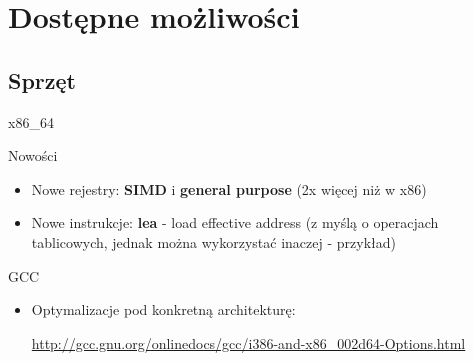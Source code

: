 \section{Dostępne możliwości} %
\subsection{Sprzęt}
\begin{frame}[fragile]{x86\_64}
	\begin{block}{Nowości}
		\begin{itemize}
			\item Nowe rejestry: \textbf{SIMD} i \textbf{general purpose} (2x więcej niż w x86)
			\item Nowe instrukcje: \textbf{lea} - load effective address (z myślą o operacjach
			tablicowych, jednak można wykorzystać inaczej - przykład)
		\end{itemize}
	\end{block}
	\begin{block}{GCC}
 		\begin{itemize}
 			 \item Optymalizacje pod konkretną architekturę:
 			 \url{http://gcc.gnu.org/onlinedocs/gcc/i386-and-x86_002d64-Options.html}

 			 
 			 
 			 
 		\end{itemize}		
 	\end{block}
\end{frame}
